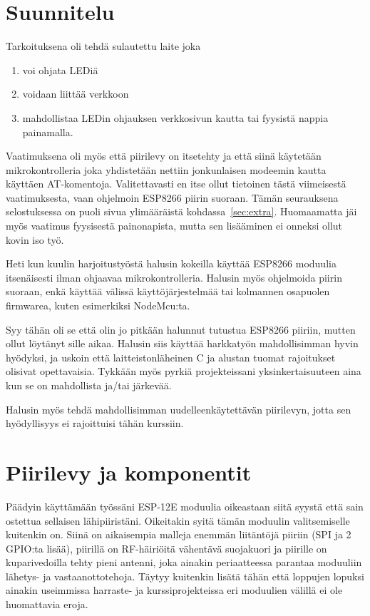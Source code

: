 \section{Suunnitelu}
Tarkoituksena oli tehdä sulautettu laite joka
\begin{enumerate}
  \item voi ohjata LEDiä
  \item voidaan liittää verkkoon
  \item mahdollistaa LEDin ohjauksen verkkosivun kautta tai fyysistä nappia
    painamalla.
\end{enumerate}
Vaatimuksena oli myös että piirilevy on itsetehty ja että siinä käytetään
mikrokontrolleria joka yhdistetään nettiin jonkunlaisen modeemin kautta
käyttäen AT-komentoja. Valitettavasti en itse ollut tietoinen tästä viimeisestä
vaatimuksesta, vaan ohjelmoin ESP8266 piirin suoraan. Tämän seurauksena
selostuksessa on puoli sivua ylimääräistä kohdassa~\ref{sec:extra}. Huomaamatta
jäi myös vaatimus fyysisestä painonapista, mutta sen lisääminen ei
onneksi ollut kovin iso työ.

Heti kun kuulin harjoitustyöstä halusin kokeilla käyttää ESP8266 moduulia
itsenäisesti ilman ohjaavaa mikrokontrolleria. Halusin myös ohjelmoida piirin
suoraan, enkä käyttää välissä käyttöjärjestelmää tai kolmannen osapuolen
firmwarea, kuten esimerkiksi NodeMcu:ta.\cite{nodemcu}

Syy tähän oli se että olin jo pitkään halunnut tutustua ESP8266 piiriin, mutten
ollut löytänyt sille aikaa. Halusin siis käyttää harkkatyön mahdollisimman
hyvin hyödyksi, ja uskoin että laitteistonläheinen C ja alustan tuomat
rajoitukset olisivat opettavaisia. Tykkään myös pyrkiä projekteissani
yksinkertaisuuteen aina kun se on mahdollista ja/tai järkevää.

Halusin myös tehdä mahdollisimman uudelleenkäytettävän piirilevyn, jotta sen
hyödyllisyys ei rajoittuisi tähän kurssiin.

\section{Piirilevy ja komponentit}
Päädyin käyttämään työssäni ESP-12E moduulia oikeastaan siitä syystä että sain
ostettua sellaisen lähipiiristäni. Oikeitakin syitä tämän moduulin
valitsemiselle kuitenkin on. Siinä on aikaisempia malleja enemmän liitäntöjä
piiriin (SPI ja 2 GPIO:ta lisää), piirillä on RF-häiriöitä vähentävä suojakuori
ja piirille on kuparivedoilla tehty pieni antenni, joka ainakin periaatteessa
parantaa moduuliin lähetys- ja vastaanottotehoja. Täytyy kuitenkin lisätä tähän
että loppujen lopuksi ainakin useimmissa harraste- ja kurssiprojekteissa eri
moduulien välillä ei ole huomattavia eroja.

